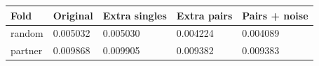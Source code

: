 \begin{tabular}{lllll}
\toprule
Fold & Original & Extra singles & Extra pairs & Pairs + noise \\
\midrule
random & 0.005032 & 0.005030 & 0.004224 & 0.004089 \\
partner & 0.009868 & 0.009905 & 0.009382 & 0.009383 \\
\bottomrule
\end{tabular}
